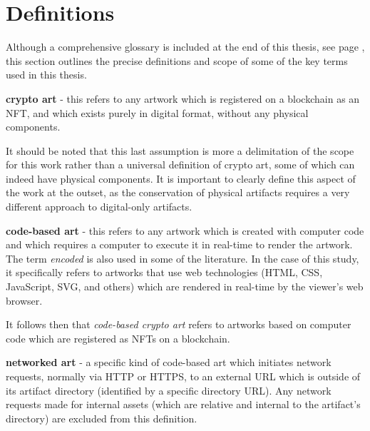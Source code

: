 \section{Definitions}
\label{sec:definitions}

Although a comprehensive glossary is included at the end of this thesis, see page \pageref{sec:glossary}, this section outlines the precise definitions and scope of some of the key terms used in this thesis.

\vspace{0.5cm}

\textbf{crypto art} - this refers to any artwork which is registered on a blockchain as an NFT, and which exists purely in digital format, without any physical components.

\vspace{0.5cm}

It should be noted that this last assumption is more a delimitation of the scope for this work rather than a universal definition of crypto art, some of which can indeed have physical components. It is important to clearly define this aspect of the work at the outset, as the conservation of physical artifacts requires a very different approach to digital-only artifacts.

\vspace{0.5cm}

\textbf{code-based art} - this refers to any artwork which is created with computer code and which requires a computer to execute it in real-time to render the artwork. The term \emph{encoded} is also used in some of the literature. In the case of this study, it specifically refers to artworks that use web technologies (HTML, CSS, JavaScript, SVG, and others) which are rendered in real-time by the viewer's web browser.

\vspace{0.5cm}

It follows then that \emph{code-based crypto art} refers to artworks based on computer code which are registered as NFTs on a blockchain.

\vspace{0.5cm}

\textbf{networked art} - a specific kind of code-based art which initiates network requests, normally via HTTP or HTTPS, to an external URL which is outside of its artifact directory (identified by a specific directory URL). Any network requests made for internal assets (which are relative and internal to the artifact's directory) are excluded from this definition.

